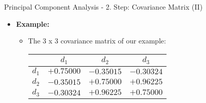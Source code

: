 \begin{frame}{Principal Component Analysis - 2. Step: Covariance Matrix (II)}
	\begin{itemize}
		\item \textbf{Example:}
		      \begin{itemize}
			      \item The 3 x 3 covariance matrix of our example: \\
			            \vspace{3mm}
			            \begin{center}
				            \centering
				            \begin{tabular}{|l|c|c|c|}
					            \hline
					                  & $d_1$      & $d_2$      & $d_3$
					            \\\hline
					            $d_1$ & $+0.75000$ & $-0.35015$ &
					            $-0.30324$
					            \\\hline
					            $d_2$ & $-0.35015$ & $+0.75000$ &
					            $+0.96225$
					            \\\hline
					            $d_3$ & $-0.30324$ & $+0.96225$ &
					            $+0.75000$
					            \\\hline
				            \end{tabular}
			            \end{center}
		      \end{itemize}
	\end{itemize}
\end{frame}

